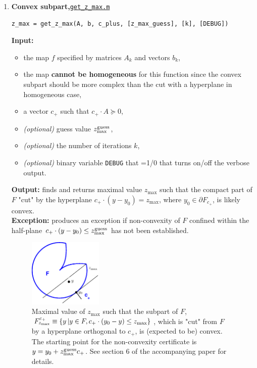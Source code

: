 \documentclass[a4paper]{article}
\theoremstyle{definition}
\begin{document}
\begin{enumerate}
\item {\bf Convex subpart,\hskip 6pt}\underline{\tt get\_z\_max.m}
\begin{verbatim}
z_max = get_z_max(A, b, c_plus, [z_max_guess], [k], [DEBUG])
\end{verbatim}
{\bf Input:}
\begin{itemize}
	\item the map $f$ specified by matrices $A_k$ and vectors $b_k$,
	\item the map {\bf cannot be homogeneous} for this function since the convex subpart should be more complex than the cut with a hyperplane in homogeneous case,
	\item a vector $c_+$ such that $c_+\cdot A\succeq 0$,
	\item {\it (optional)}  guess value  $z^{\rm guess}_{\rm max}$,
	\item {\it (optional)} the number of iterations $k$,
	\item {\it (optional)}  binary variable {\tt DEBUG} that =1/0 that turns on/off the verbose output.
\end{itemize}
{\bf Output:} finds and returns maximal value $z_{\max}$ such that the compact part of $F$ "cut" by the hyperplane  $c_+ \cdot (y-y_0)=z_{\max}$, where $y_0\in \partial F_{c_+}$, is  likely convex. \\
{\bf Exception:} produces an exception if non-convexity of $F$ confined within the half-plane $c_+ \cdot (y-y_0)\leq z^{\rm guess}_{\rm max}$  has not been established.

\begin{figure}[H]
	\centering\includegraphics[width=100pt]{fig/get_z_max}
\captionsetup{width=.8\linewidth}
	\caption{Maximal value of $z_{\max}$ such that  the subpart of $F$, $F^{c_+}_{z_{\rm max}}\equiv \{y\, | y\in F, c_+ \cdot (y_0-y)\leq z_{\rm max}\}$, which is "cut" from $F$ by a hyperplane orthogonal  to $c_+$, is (expected to be) convex. The starting point for the non-convexity certificate is $y=y_0+z^{\rm guess}_{\rm max}c_+$. See section 6 of the accompanying paper for details.}
\label{fig:four}
\end{figure}



\end{enumerate}
\end{document}
